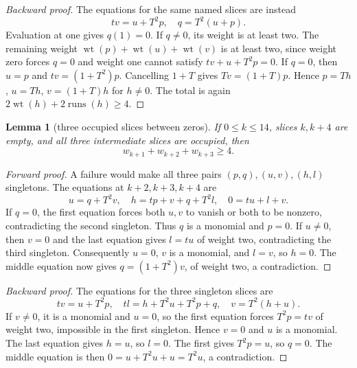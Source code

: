 \documentclass{article}
\newtheorem{lemma}{Lemma}
\DeclareMathOperator{\wt}{wt}
\DeclareMathOperator{\runs}{runs}
\begin{document}
\begin{proof}[Backward proof]
  The equations for the same named slices are instead
  \begin{equation}
    tv = u + T^2 p, \quad q = T^2(u + p).
  \end{equation}
  Evaluation at one gives \(q(1) = 0\). If \(q \ne 0\), its weight is at least two. The
  remaining weight \(\wt(p) + \wt(u) + \wt(v)\) is at least two, since weight zero forces
  \(q = 0\) and weight one cannot satisfy \(tv + u + T^2 p = 0\). If \(q = 0\), then
  \(u = p\) and \(tv = (1 + T^2)p\). Cancelling \(1 + T\) gives \(Tv = (1 + T)p\). Hence
  \(p = Th\), \(u = Th\), \(v = (1 + T)h\) for \(h \ne 0\). The total is again
  \(2\wt(h) + 2\runs(h) \ge 4\).
\end{proof}

\begin{lemma}[three occupied slices between zeros]\label{lem:three-occupied}
  If \(0 \le k \le 14\), slices \(k, k + 4\) are empty, and all three intermediate slices are
  occupied, then
  \begin{equation}
    w_{k+1} + w_{k+2} + w_{k+3} \ge 4.
  \end{equation}
\end{lemma}

\begin{proof}[Forward proof]
  A failure would make all three pairs \((p,q), (u,v), (h,l)\) singletons. The equations at
  \(k + 2, k + 3, k + 4\) are
  \begin{equation}
    u = q + T^2 v, \quad h = tp + v + q + T^2 l, \quad 0 = tu + l + v.
  \end{equation}
  If \(q = 0\), the first equation forces both \(u, v\) to vanish or both to be nonzero,
  contradicting the second singleton. Thus \(q\) is a monomial and \(p = 0\). If \(u \ne 0\),
  then \(v = 0\) and the last equation gives \(l = tu\) of weight two, contradicting the third
  singleton. Consequently \(u = 0\), \(v\) is a monomial, and \(l = v\), so \(h = 0\). The
  middle equation now gives \(q = (1 + T^2)v\), of weight two, a contradiction.
\end{proof}

\begin{proof}[Backward proof]
  The equations for the three singleton slices are
  \begin{equation}
    tv = u + T^2 p, \quad tl = h + T^2 u + T^2 p + q, \quad v = T^2(h + u).
  \end{equation}
  If \(v \ne 0\), it is a monomial and \(u = 0\), so the first equation forces
  \(T^2 p = tv\) of weight two, impossible in the first singleton. Hence \(v = 0\) and \(u\)
  is a monomial. The last equation gives \(h = u\), so \(l = 0\). The first gives
  \(T^2 p = u\), so \(q = 0\). The middle equation is then \(0 = u + T^2 u + u = T^2 u\), a
  contradiction.
\end{proof}
\end{document}
